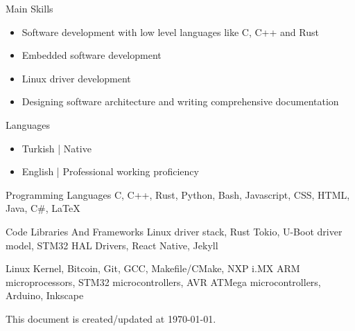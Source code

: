 \documentclass[10pt]{brutalist}
\begin{document}
\begin{multicols}{2}
\skillbox
{Main Skills}
{
\begin{itemize}
	\item Software development with low level languages like C, C++ and Rust
	\item Embedded software development
	\item Linux driver development
	\item Designing software architecture and writing comprehensive documentation
\end{itemize}
}

\skillbox
{Languages}
{
\begin{itemize}
	\item Turkish | Native
	\item English | Professional working proficiency
\end{itemize}
}

\skillbox
{Programming Languages}
{C, C++, Rust, Python, Bash, Javascript, CSS, HTML, Java, C\#, \LaTeX}

\skillbox
{Code Libraries And Frameworks}
{Linux driver stack, Rust Tokio, U-Boot driver model, STM32 HAL Drivers, React Native, Jekyll}

{Linux Kernel, Bitcoin, Git, GCC, Makefile/CMake, NXP i.MX ARM microprocessors, STM32 microcontrollers, AVR ATMega microcontrollers, Arduino, Inkscape}
\end{multicols}

\vfill\null
\hfill\null\footnotesize This document is created/updated at \today.
\end{document}
